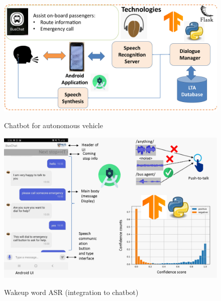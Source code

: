 \documentclass[10pt]{article}
\begin{document}
\begin{figure}[h]
	\centering
\href{http://ece.nus.edu.sg/hlt/st-kinetics-autonomous-bus-trial-2/}{\includegraphics[trim=0 0 0 0, clip,scale=0.15]{Buschat.pdf}}
\caption{Chatbot for autonomous vehicle}
\end{figure}

\begin{figure}[h]
	\centering
	\href{https://github.com/maulikmadhavi/Hellobus_tflite}{\includegraphics[trim=10 0 0 0, clip,scale=0.2]{wakeupword.pdf}}
	\caption{Wakeup word ASR (integration to chatbot)}
\end{figure}
\end{document}
